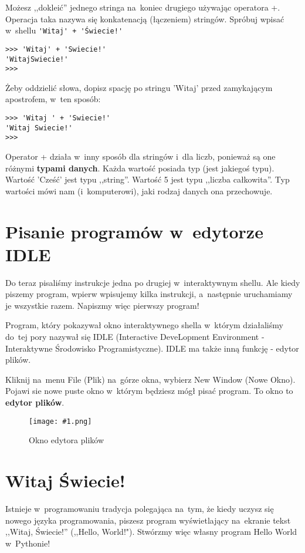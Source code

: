 \documentclass{book}
\newcommand{\img}[3]{
\begin{figure}
\centerline{
	\texttt{[image: \#1.png]}
}
\caption{#2}
\label{#1}
\end{figure}
}
\begin{document}
Możesz ,,dokleić'' jednego stringa na~koniec drugiego używając operatora +. Operacja taka nazywa się konkatenacją (łączeniem) stringów. Spróbuj wpisać w~shellu \lstinline{'Witaj' + 'Świecie!'}

\begin{lstlisting}
>>> 'Witaj' + 'Swiecie!'
'WitajSwiecie!'
>>>
\end{lstlisting}

Żeby oddzielić słowa, dopisz spację po stringu 'Witaj' przed zamykającym apostrofem, w~ten sposób:

\begin{lstlisting}
>>> 'Witaj ' + 'Swiecie!'
'Witaj Swiecie!'
>>> 
\end{lstlisting}

Operator + działa w~inny sposób dla stringów i~dla liczb, ponieważ są one różnymi {\bf typami danych}. Każda wartość posiada typ (jest jakiegoś typu). Wartość 'Cześć' jest typu ,,string''. Wartość 5 jest typu ,,liczba całkowita''. Typ wartości mówi nam (i~komputerowi), jaki rodzaj danych ona przechowuje. 

\section{Pisanie programów w~edytorze IDLE}

Do teraz pisaliśmy instrukcje jedna po drugiej w~interaktywnym shellu. Ale kiedy piszemy program, wpierw wpisujemy kilka instrukcji, a~następnie uruchamiamy je wszystkie razem. Napiszmy więc pierwszy program!

Program, który pokazywał okno interaktywnego shella w~którym działaliśmy do~tej pory nazywał się IDLE (Interactive DeveLopment Environment - Interaktywne Środowisko Programistyczne). IDLE ma także inną funkcję - edytor plików.

Kliknij na~menu File (Plik) na~górze okna, wybierz New Window (Nowe Okno). Pojawi sie nowe puste okno w~którym będziesz mógł pisać program. To okno to {\bf edytor plików}.

\img{strings-fileeditor}{Okno edytora plików}{7 cm}

\section{Witaj Świecie!}

Istnieje w~programowaniu tradycja polegająca na~tym, że kiedy uczysz się nowego języka programowania, piszesz program wyświetlający na~ekranie tekst ,,Witaj, Świecie!'' (,,Hello, World!"). Stwórzmy więc własny program Hello World w~Pythonie!
\end{document}
